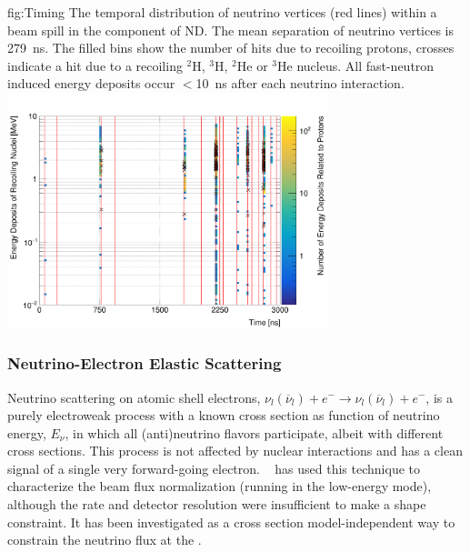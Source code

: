 \begin{dunefigure}{fig:Timing}
{The temporal distribution of neutrino vertices (red lines) within a beam spill in the  component of  ND.
		The mean separation of neutrino vertices is \SI{279}{\nano\second}. The filled bins show the number of hits due to recoiling protons, crosses indicate a hit due to a recoiling $^{2}$H, $^3$H, $^2$He or $^3$He nucleus.
		All fast-neutron induced energy deposits occur $<$\SI{10}{\nano\second} after each neutrino interaction.}
\includegraphics[width=0.7\textwidth]{graphics/recoil_proton_edep_vs_vtx_time_a.png}
\end{dunefigure}
	
\subsubsection{Neutrino-Electron Elastic Scattering}
\label{ssec:lartpc-nu-electron-scatt}

Neutrino scattering on atomic shell electrons, $\nu_{l}(\overline{\nu}_{l}) + e^{-} \rightarrow \nu_{l}(\overline{\nu}_{l}) + e^{-}$,
is a purely electroweak process with a known cross section as function of neutrino energy, $E_{\nu}$, in which all (anti)neutrino flavors participate, albeit with different cross sections. This process is not affected by nuclear interactions and has a clean signal of a single very forward-going electron. ~\cite{Park:2015eqa} has used this technique to characterize the  beam flux normalization (running in the  low-energy mode), although the rate and detector resolution were insufficient to make a shape constraint. It has been investigated as a cross section model-independent way to constrain the neutrino flux at the   .

